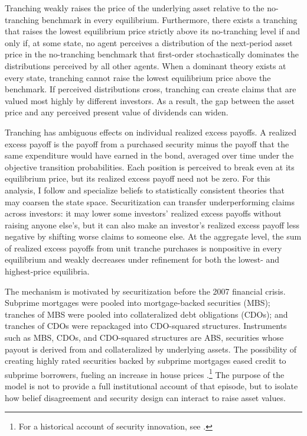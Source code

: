 \documentclass[11pt]{article}
\theoremstyle{plain}
\begin{document}
Tranching weakly raises the price of the underlying asset relative to the no-tranching benchmark in every equilibrium. Furthermore, there exists a tranching that raises the lowest equilibrium price strictly above its no-tranching level if and only if, at some state, no agent perceives a distribution of the next-period asset price in the no-tranching benchmark that first-order stochastically dominates the distributions perceived by all other agents. When a dominant theory exists at every state, tranching cannot raise the lowest equilibrium price above the benchmark. If perceived distributions cross, tranching can create claims that are valued most highly by different investors. As a result, the gap between the asset price and any perceived present value of dividends can widen.

Tranching has ambiguous effects on individual realized excess payoffs. A realized excess payoff is the payoff from a purchased security minus the payoff that the same expenditure would have earned in the bond, averaged over time under the objective transition probabilities. Each position is perceived to break even at its equilibrium price, but its realized excess payoff need not be zero. For this analysis, I follow \cite{EysterPiccione2014} and specialize beliefs to statistically consistent theories that may coarsen the state space. Securitization can transfer underperforming claims across investors: it may lower some investors' realized excess payoffs without raising anyone else's, but it can also make an investor's realized excess payoff less negative by shifting worse claims to someone else. At the aggregate level, the sum of realized excess payoffs from unit tranche purchases is nonpositive in every equilibrium and weakly decreases under refinement for both the lowest- and highest-price equilibria.

The mechanism is motivated by securitization before the 2007 financial crisis. Subprime mortgages were pooled into mortgage-backed securities (MBS); tranches of MBS were pooled into collateralized debt obligations (CDOs); and tranches of CDOs were repackaged into CDO-squared structures. Instruments such as MBS, CDOs, and CDO-squared structures are ABS, securities whose payout is derived from and collateralized by underlying assets. The possibility of creating highly rated securities backed by subprime mortgages eased credit to subprime borrowers, fueling an increase in house prices \citep{Brunnermeier2009}.\footnote{For a historical account of security innovation, see \cite{Matthews1994}.} The purpose of the model is not to provide a full institutional account of that episode, but to isolate how belief disagreement and security design can interact to raise asset values.
\end{document}
